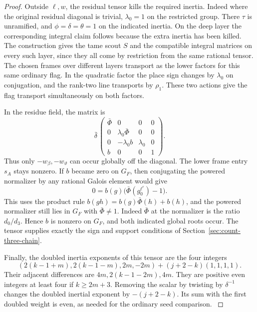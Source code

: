 \begin{proof}
Outside \(\ell,w\), the residual tensor kills the
required inertia. Indeed where the original
residual diagonal is trivial, \(\lambda_0=1\) on
the restricted group. There \(\tau\) is unramified,
and \(\phi=\delta=\theta=1\) on the indicated inertia.
On the deep layer the corresponding integral claim
follows because the extra inertia has been killed.
The construction gives the tame scout \(S\) and
the compatible integral matrices on every such
layer, since they all come by restriction from the
same rational tensor. The chosen frames over
different layers transport as the lower factors
for this same ordinary flag. In the quadratic
factor the place sign changes by \(\lambda_0\)
on conjugation, and the rank-two line transports
by \(\rho_1\). These two actions give the flag
transport simultaneously on both factors.

In the residue field, the matrix is
\[
       \bar\delta\,
       \begin{pmatrix}
        \bar\Phi&0&0&0\\
        0&\lambda_0\bar\Phi&0&0\\
        0&-\lambda_0 b&\lambda_0&0\\
        b&0&0&1
       \end{pmatrix}.
\]
Thus only \(-w_\beta,-w_\vartheta\) can occur
globally off the diagonal. The lower frame entry
\(s_A\) stays nonzero. If \(b\) became zero on
\(G_F\), then conjugating the powered normalizer
by any rational Galois element would give
\[
           0=b(g)\bigl(\bar\Phi(g_0^{\ell^r})-1\bigr).
\]
This uses the product rule
\(b(gh)=b(g)\bar\Phi(h)+b(h)\), and the powered
normalizer still lies in \(G_F\) with
\(\bar\Phi\ne1\). Indeed \(\bar\Phi\) at the normalizer
is the ratio \(d_0/d_3\). Hence \(b\) is nonzero
on \(G_F\), and both indicated global roots occur.
The tensor supplies exactly the sign and support
conditions of Section~\ref{sec:count-three-chain}.

Finally, the doubled inertia exponents of this
tensor are the four integers
\[
 (2(k-1+m),2(k-1-m),2m,-2m)+(j+2-k)(1,1,1,1).
\]
Their adjacent differences are
\(4m,2(k-1-2m),4m\).
They are positive even integers at least four if
\(k\ge2m+3\). Removing the scalar by twisting
by \(\delta^{-1}\) changes the doubled inertial
exponent by \(-(j+2-k)\). Its sum with the first
doubled weight is even, as needed for the
ordinary seed comparison.
\hfill\mbox{\cite{ray-class}}\label{cor:ordinary-count-iii-seed-2}

\end{proof}

